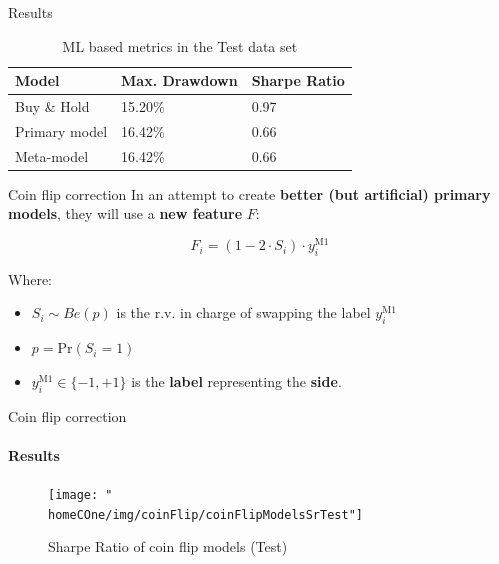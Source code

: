 \documentclass[usenames,dvipsnames]{beamer} %
\newcommand{\homeCOne}{../../Chapter 1 - Metalabeling/Draft}
\begin{document}
\begin{frame}{Results}
	\begin{table}[htbp]
		\scriptsize
		\centering
		\caption{ML based metrics in the Test data set}
		\vspace{-.2cm}
		\begin{tabular}{ |C{2cm}|C{2.5cm}|C{2cm}| }
			\hline
			Model 			& Max. Drawdown & Sharpe Ratio\\
			\hline
			 Buy \& Hold &  15.20\% &
			 0.97\\ 
			 Primary model & 
			 16.42\% &
			 0.66\\ 
			 Meta-model &  
			16.42\% &
			 0.66\\ 
			\hline
		\end{tabular}
	\end{table}
	
\end{frame}

\begin{frame}{Coin flip correction}
\vfill
In an attempt to create \textbf{better (but artificial) primary models}, they 
will use a \textbf{new feature} $F$:

\vfill
\begin{equation*}
	F_i = (1 - 2 \cdot S_i) \cdot y_i^{\text{M1}}
\end{equation*}

\vfill
Where:
\begin{itemize}
	\item $S_i \sim Be(p)$ is the r.v. in charge of swapping the label 
	$y_i^{\text{M1}}$
	
	\vspace{.15cm}
	\item $p = \text{Pr}(S_i = 1)$
	
	\vspace{.15cm}
	\item $y_i^{\text{M1}} \in \{-1,+1\}$ is the \textbf{label} representing 
	the \textbf{side}.
\end{itemize}
\vfill

\end{frame}

\begin{frame}{Coin flip correction}
\framesubtitle{Results}
\begin{figure}
	\centering
    \texttt{[image: "\\homeCOne/img/coinFlip/coinFlipModelsSrTest"]} 
    \caption{Sharpe Ratio of coin flip models (Test)}
\end{figure}

\end{frame}
\end{document}
